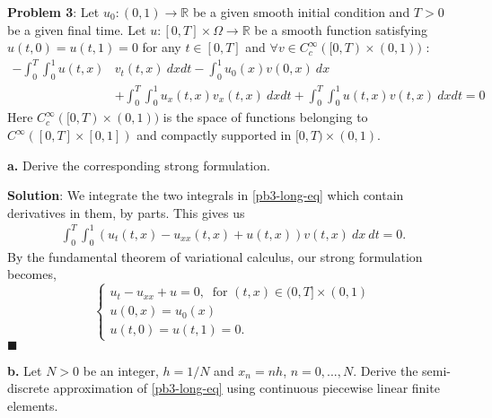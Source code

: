 \documentclass[11pt]{article}
\begin{document}
\vskip 2cm




{\bf Problem 3}: Let $u_0 : (0,1) \to \mathbb{R}$ be a given smooth initial condition and $T > 0$ be a given final time. Let $u : [0, T] \times \Omega \to \mathbb{R}$ be a smooth function satisfying $u(t,0)  = u(t,1) = 0$ for any $t \in [0,T]$ and $\forall v \in C^{\infty}_c ([0, T) \times (0,1) )$ :
\begin{equation}
\begin{split} \label{pb3-long-eq}
-\int_0^T \int_0^1 u(t,x) &v_t(t,x) \: dx dt - \int_0^1 u_0(x) v(0,x) \: dx \\
&+ \int_0^T \int_0^1 u_x(t,x) v_x(t,x) \: dx dt + \int_0^T \int_0^1 u(t,x) v(t,x) \: dx dt = 0
\end{split}
\end{equation}
Here $C^\infty_c ([0,T) \times (0,1) )$ is the space of functions belonging to $C^\infty ([0,T] \times [0,1])$ and compactly supported in $[0,T) \times (0,1)$.


\vskip 1cm




{\bf a.} Derive the corresponding strong formulation.

\vskip 1cm

{\bf Solution}: We integrate the two integrals in \eqref{pb3-long-eq} which contain derivatives in them, by parts.
This gives us
\begin{equation*}
\begin{split}
    \int_0^T \int_0^1 (u_t(t,x)  - u_{xx}(t,x)  + u(t,x)) v(t,x) \: dx \: dt = 0.
\end{split}
\end{equation*}
By the fundamental theorem of variational calculus, our strong formulation becomes,
\begin{equation}
\begin{cases}
    u_t - u_{xx} + u = 0, \: \text{ for } (t,x) \in (0,T]\times (0,1) \\
    u(0,x) = u_0(x) \\
    u(t,0) = u(t,1) = 0.
\end{cases}
\end{equation}
$\blacksquare$


\vskip 2cm



{\bf b.}  Let $N > 0$ be an integer, $h = 1/N$ and $x_n = n h$, $n = 0, ..., N$. 
Derive the semi-discrete
approximation of \eqref{pb3-long-eq} using continuous piecewise linear finite elements.
\end{document}
